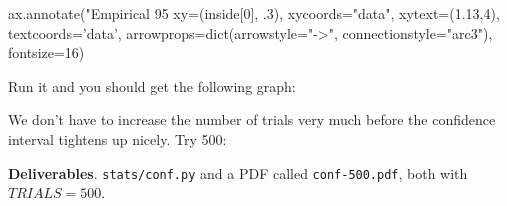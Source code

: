 \begin{fullwidth}
{\begin{pyverbatim}
ax.annotate("Empirical 95%
			 xy=(inside[0], .3),
			 xycoords="data",
			 xytext=(1.13,4), textcoords='data',
			 arrowprops=dict(arrowstyle="->",
                            connectionstyle="arc3"),
			 fontsize=16)
\end{pyverbatim}
}

\step Run it and you should get the following graph:


\step  We don't have to increase the number of trials very much before the confidence interval tightens up nicely. Try 500:


\begin{callout}{\bcplume}
{\bf Deliverables}. {\tt stats/conf.py} and a PDF called {\tt conf-500.pdf}, both with $TRIALS=500$.
\end{callout}

\end{fullwidth}

